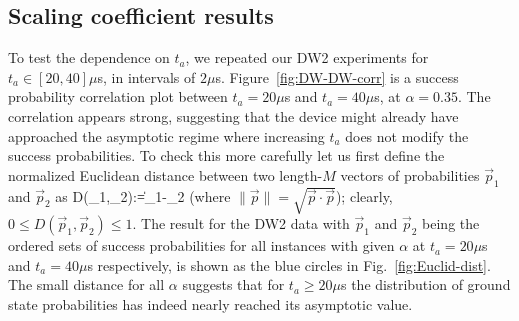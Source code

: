 \subsection{Scaling coefficient results}
To test the dependence on $t_a$, we repeated our DW2 experiments for $t_a \in [20,40]\mu$s, in intervals of $2\mu$s. Figure~\ref{fig:DW-DW-corr} is a success probability correlation plot between $t_a=20\mu$s and $t_a=40\mu$s, at $\alpha=0.35$. The correlation appears strong, suggesting that the device might already have approached the asymptotic regime where increasing $t_a$ does not modify the success probabilities. To check this more carefully let us first define the normalized Euclidean distance between two length-$M$ vectors of probabilities $\vec{p}_1$ and $\vec{p}_2$ as
\beq
D(_1,_2):=\|_1-_2\|
\label{eq:D}
\eeq
(where $\|\vec{p}\|=\sqrt{\vec{p}\cdot\vec{p}}$); clearly, $0\leq D(\vec{p}_1,\vec{p}_2) \leq 1$. The result for the DW2 data with $\vec{p}_1$ and $\vec{p}_2$ being the ordered sets of success probabilities for all
instances with given $\alpha$ at $t_a=20\mu$s and $t_a=40\mu$s respectively, is shown as the blue circles in Fig.~\ref{fig:Euclid-dist}. The small distance for all $\alpha$ suggests that for $t_a \geq 20\mu$s the distribution of ground state probabilities has indeed nearly reached its asymptotic value.


